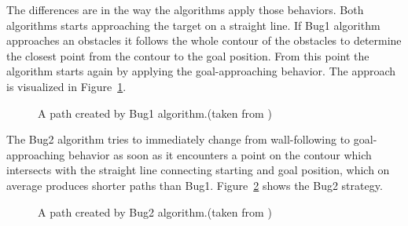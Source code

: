 The differences are in the way the algorithms apply those behaviors.
Both algorithms starts approaching the target on a straight line.
If Bug1 algorithm approaches an obstacles it follows the whole contour of the obstacles to determine the closest point from the contour to the goal position.
From this point the algorithm starts again by applying the goal-approaching behavior.
The approach is visualized in Figure~\ref{fig:bug1}.
\begin{figure}[thpb]
	  \myfloatalign
      \footnotesize
      \centering
   \caption[Bug1]{A path created by Bug1 algorithm.(taken from \cite{ribeiro2005obstacle})}
   \label{fig:bug1}
\end{figure}

The Bug2 algorithm tries to immediately change from wall-following to goal-approaching behavior as soon as it encounters a point on the contour which intersects with the straight line connecting starting and goal position, which on average produces shorter paths than Bug1.
Figure~\ref{fig:bug2} shows the Bug2 strategy. 

\begin{figure}[thpb]
	  \myfloatalign
      \footnotesize
      \centering
   \caption[Bug2]{A path created by Bug2 algorithm.(taken from \cite{ribeiro2005obstacle})}
   \label{fig:bug2}
\end{figure}

